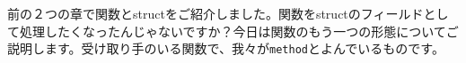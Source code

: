 前の２つの章で関数とstructをご紹介しました。関数をstructのフィールドとして処理したくなったんじゃないですか？今日は関数のもう一つの形態についてご説明します。受け取り手のいる関数で、我々が\texttt{method}とよんでいるものです。
